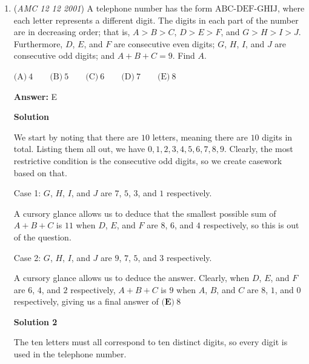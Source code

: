 \begin{enumerate}
 $\textbf{(C)}\ \dfrac{9!}{2^{5}}$ = is just 113400 divided by 10(11340), so still too big 

 $\textbf{(D)}\ \dfrac{10!}{2^{5} \cdot 5!}$ = 113400/120= 945, just perfect

 $\textbf{(E)}\ \dfrac{5!}{2^{5}}$ = 3.75 or just too small

 So D is equal to 945, thus the answer is $\boxed{\textbf{(D)} \dfrac{10000!}{2^{5000} \cdot 5000!}}$.

 


	\item (\textit{AMC 12 12 2001}) A telephone number has the form $\text{ABC-DEF-GHIJ}$, where each letter represents
a different digit. The digits in each part of the number are in decreasing
order; that is, $A > B > C$, $D > E > F$, and $G > H > I > J$. Furthermore,
$D$, $E$, and $F$ are consecutive even digits; $G$, $H$, $I$, and $J$ are consecutive odd
digits; and $A + B + C = 9$. Find $A$.


 $\text{(A)}\ 4\qquad \text{(B)}\ 5\qquad \text{(C)}\ 6\qquad \text{(D)}\ 7\qquad \text{(E)}\ 8$

 \textbf{Answer: }E



\textbf{Solution}

We start by noting that there are $10$ letters, meaning there are $10$ digits in total. Listing them all out, we have $0, 1, 2, 3, 4, 5, 6, 7, 8, 9$. Clearly, the most restrictive condition is the consecutive odd digits, so we create casework based on that.

 Case 1: $G$, $H$, $I$, and $J$ are $7$, $5$, $3$, and $1$ respectively. 

 A cursory glance allows us to deduce that the smallest possible sum of $A + B + C$ is $11$ when $D$, $E$, and $F$ are $8$, $6$, and $4$ respectively, so this is out of the question.

 Case 2: $G$, $H$, $I$, and $J$ are $9$, $7$, $5$, and $3$ respectively. 

 A cursory glance allows us to deduce the answer. Clearly, when $D$, $E$, and $F$ are $6$, $4$, and $2$ respectively, $A + B + C$ is $9$ when $A$, $B$, and $C$ are $8$, $1$, and $0$ respectively, giving us a final answer of $\boxed{\textbf{(E)}\ 8}$




\textbf{Solution 2}

The ten letters must all correspond to ten distinct digits, so every digit is used in the telephone number.


\end{enumerate}
